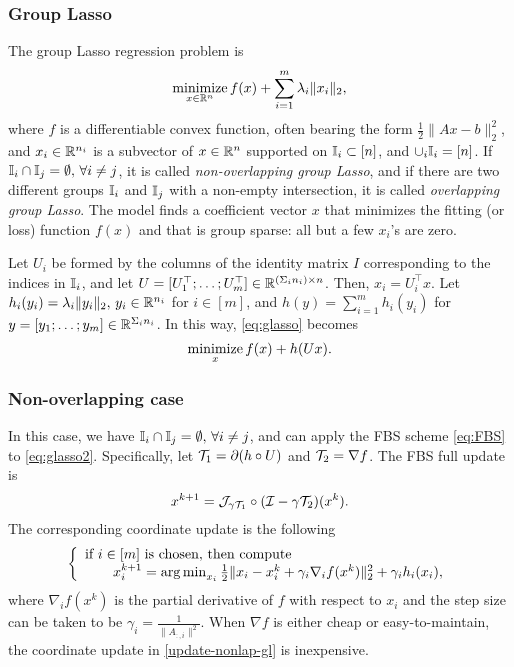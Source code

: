 \subsubsection{Group Lasso}\label{sec:glasso}
The group Lasso regression problem \cite{YL2006GrpLasso} is 
\begin{equation}\label{eq:glasso}
\Min_{x\in\RR^n}  f(x)+\sum_{i=1}^m\lambda_i\|x_i\|_2,
\end{equation} 
where $ f$ is a differentiable convex function, often bearing the form $\frac{1}{2}\|Ax-b\|_2^2$, and $x_i\in \mathbb{R}^{n_i}$ is a subvector of $x\in\mathbb{R}^n$ supported on $\mathbb{I}_i\subset [n]$, and $\cup_i \mathbb{I}_i= [n]$. If $\mathbb{I}_i\cap \mathbb{I}_j =\emptyset, \,\forall i\neq j$, it is called \emph{non-overlapping group Lasso}, and if there are two different groups $\mathbb{I}_i$ and $\mathbb{I}_j$ with a non-empty intersection, it is called \emph{overlapping group Lasso}. The model finds a coefficient vector $x$ that minimizes the fitting (or loss) function $f(x)$ and that is group sparse: all but a few $x_i$'s are zero.  

Let $U_i$ be formed by the columns of the identity matrix $I$ corresponding to the indices in $\mathbb{I}_i$, and let $U=[U_1^\top;\ldots;U_m^\top]\in\mathbb{R}^{(\Sigma_i n_i)\times n}$. Then, $x_i=U_i^\top x$. Let $h_i(y_i)=\lambda_i\|y_i\|_2,\,y_i\in\mathbb{R}^{n_i}$ for $i \in [m]$, and $h(y)=\sum_{i=1}^m h_i(y_i)$ for $y=[y_1;\ldots;y_m]\in\mathbb{R}^{\Sigma_i n_i}$. In this way, \eqref{eq:glasso} becomes
\begin{equation}\label{eq:glasso2}
\Min_x f(x)+h(Ux).
\end{equation}

\subsubsection*{Non-overlapping case~\cite{YL2006GrpLasso}} In this case, we have $\mathbb{I}_i\cap \mathbb{I}_j =\emptyset, \,\forall i\neq j$, and can apply the FBS scheme \eqref{eq:FBS} to \eqref{eq:glasso2}. Specifically, let ${\mathcal{T}}_1=\partial (h\circ U)$ and ${\mathcal{T}}_2=\nabla f$. The FBS full update is 
$$x^{k+1}={\mathcal{J}}_{\gamma {\mathcal{T}}_1}\circ({\mathcal{I}}-\gamma{\mathcal{T}}_2)(x^k).$$
The corresponding coordinate update is the following
\begin{equation}\label{update-nonlap-gl}
{\left\{
\begin{array}{l}
\text{if }i \in [m]\text{ is chosen, then compute}\\
\qquad x_i^{k+1}=\argmin_{x_i}\frac{1}{2}\|x_i-x_i^k+\gamma_i \nabla_i f(x^k)\|_2^2+ \gamma_i h_i(x_i),\\
\end{array}
\right.
}\end{equation}
where $\nabla_i f(x^k)$ is the partial derivative of $f$ with respect to $x_i$ and the step size can be taken to be $\gamma_i=\frac{1}{\|A_{:,i}\|^2}$. When $\nabla f$ is either cheap or easy-to-maintain,  the coordinate update in \eqref{update-nonlap-gl} is inexpensive.

